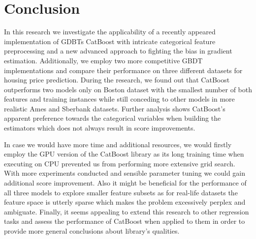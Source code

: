 \section{Conclusion}
\label{sec:conclusion}

In this research we investigate the applicability of a recently appeared implementation of GDBTs CatBoost with intricate categorical feature preprocessing and a new advanced approach to fighting the bias in gradient estimation. Additionally, we employ two more competitive GBDT implementations and compare their performance on three different datasets for housing price prediction. During the research, we found out that CatBoost outperforms two models only on Boston dataset with the smallest number of both features and training instances while still conceding to other models in more realistic Ames and Sberbank datasets. Further analysis shows CatBoost's apparent preference towards the categorical variables when building the estimators which does not always result in score improvements.

In case we would have more time and additional resources, we would firstly employ the GPU version of the CatBoost library as its long training time when executing on CPU prevented us from performing more extensive grid search. With more experiments conducted and sensible parameter tuning we could gain additional score improvement. Also it might be beneficial for the performance of all three models to explore smaller feature subsets as for real-life datasets the feature space is utterly sparse which makes the problem excessively perplex and ambiguate. Finally, it seems appealing to extend this research to other regression tasks and assess the performance of CatBoost when applied to them in order to provide more general conclusions about library's qualities.